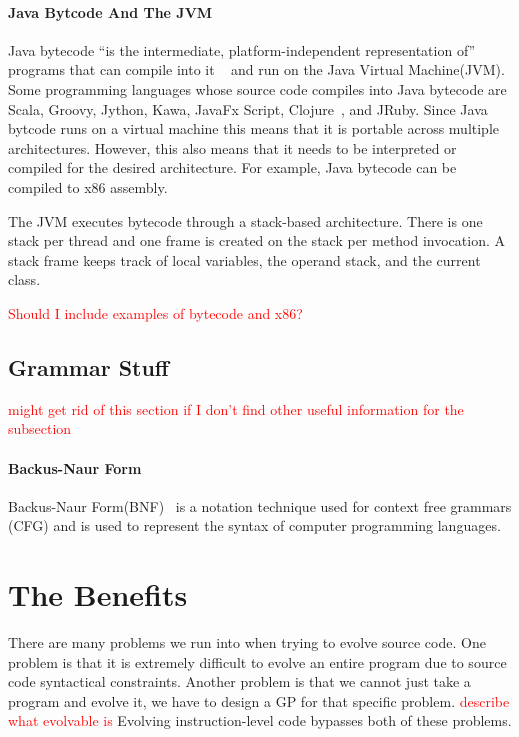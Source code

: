 \documentclass{sig-alternate}
\newcommand{\mycomment}[1]{\textcolor{red}{#1}}
\begin{document}
\paragraph{Java Bytcode And The JVM}
Java bytecode ``is the intermediate, platform-independent representation of'' programs that can compile into it ~\cite{VIII:2011} and run on the Java Virtual Machine(JVM). Some programming languages whose source code compiles into Java bytecode are Scala, Groovy, Jython, Kawa, JavaFx Script, Clojure~\cite{FINCH:2011}, and JRuby. Since Java bytcode runs on a virtual machine this means that it is portable across multiple architectures. However, this also means that it needs to be interpreted or compiled for the desired architecture. For example, Java bytecode can be compiled to x86 assembly.

The JVM executes bytecode through a stack-based architecture. There is one stack per thread and one frame is created on the stack per method invocation. A stack frame keeps track of local variables, the operand stack, and the current class.



\mycomment{Should I include examples of bytecode and x86?}


\subsection{Grammar Stuff}
\mycomment{might get rid of this section if I don't find other useful information for the subsection}
\paragraph{Backus-Naur Form}
	Backus-Naur Form(BNF)~\cite{BNF:2014} is a notation technique used for context free grammars (CFG) and is used to represent the syntax of computer programming languages.



\section{The Benefits}

There are many problems we run into when trying to evolve source code. One problem is that it is extremely difficult to evolve an entire program due to source code syntactical constraints. Another problem is that we cannot just take a program and evolve it, we have to design  a GP for that specific problem. \mycomment{describe what evolvable is} Evolving instruction-level code bypasses both of these problems.
\end{document}
